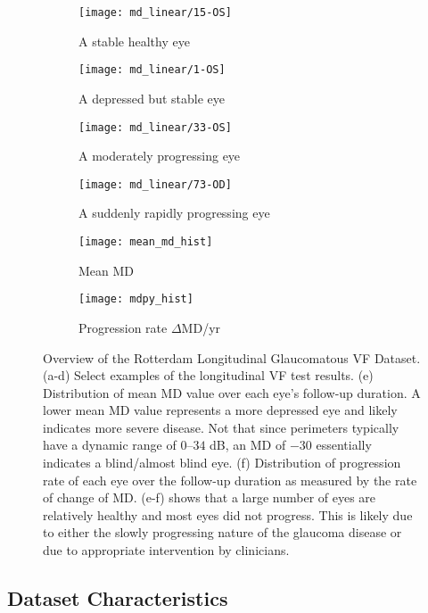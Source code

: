 \begin{figure}[p]
	\centering
	\begin{subfigure}[b]{0.49\textwidth}
		\centering
		\texttt{[image: md\_linear/15-OS]}
		\caption{A stable healthy eye}
	\end{subfigure}
	\hfill
	\begin{subfigure}[b]{0.49\textwidth}
		\centering
		\texttt{[image: md\_linear/1-OS]}
		\caption{A depressed but stable eye}
	\end{subfigure}
	\hfill
	\begin{subfigure}[b]{0.49\textwidth}
		\centering
		\texttt{[image: md\_linear/33-OS]}
		\caption{A moderately progressing eye}
	\end{subfigure}
	\hfill
	\begin{subfigure}[b]{0.49\textwidth}
		\centering
		\texttt{[image: md\_linear/73-OD]}
		\caption{A suddenly rapidly progressing eye}
	\end{subfigure}
	\hfill
	\begin{subfigure}[b]{0.49\textwidth}
		\centering
		\texttt{[image: mean\_md\_hist]}
		\caption{Mean MD}
		\label{fig:mean_md_hist}
	\end{subfigure}
	\hfill
	\begin{subfigure}[b]{0.49\textwidth}
		\centering
		\texttt{[image: mdpy\_hist]}
		\caption{Progression rate $\Delta$MD/yr}
		\label{fig:mdpy_hist}
	\end{subfigure}
	\caption[Overview of the Rotterdam Longitudinal Glaucomatous \acl{VF} Dataset]{Overview of the Rotterdam Longitudinal Glaucomatous \acl{VF} Dataset. (a-d) Select examples of the longitudinal \acl{VF} test results. (e) Distribution of mean MD value over each eye's follow-up duration. A lower mean MD value represents a more depressed eye and likely indicates more severe disease. Not that since perimeters typically have a dynamic range of $0$--$34$ dB, an MD of $-30$ essentially indicates a blind/almost blind eye. (f) Distribution of progression rate of each eye over the follow-up duration as measured by the rate of change of MD. (e-f) shows that a large number of eyes are relatively healthy and most eyes did not progress. This is likely due to either the slowly progressing nature of the glaucoma disease or due to appropriate intervention by clinicians.}
\end{figure}

\subsection{Dataset Characteristics}

